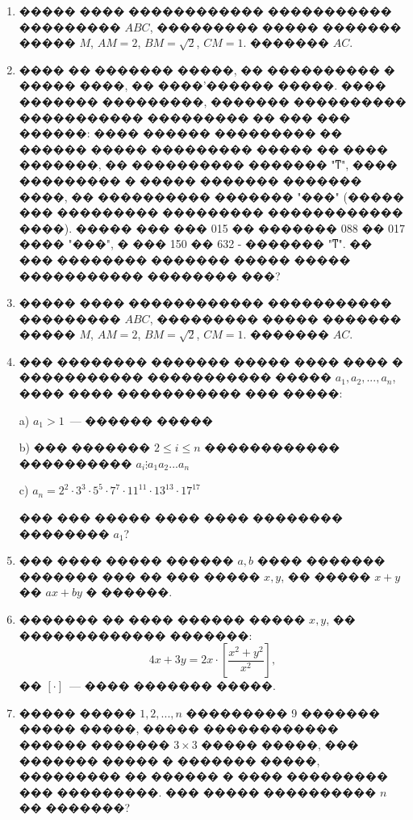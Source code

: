 \documentclass[a4paper,12pt]{article}
\begin{document}
\medskip\medskip\medskip

\begin{enumerate}

\item ����� ���� ������������ ����������� ��������� $ABC$, ��������� ����� ������� ����� $M$, $AM=2$, $BM=\sqrt{2}$, $CM=1$. ������� $AC$.



\item ���� �� ������� �����, �� ���������� � ����� ����, �� ����'������ �����. ���� ������� ���������, ������� ���������� ����������� ��������� �� ��� ��� ������: ���� ������ ��������� �� ������ ����� ��������� ����� �� ���� �������, �� ���������� ������� "ͳ", ���� ��������� � ����� ������� ������� ����, �� ���������� ������� "���" (����� ��� ��������� ��������� ������������ ����). ����� ��� ��� 015 �� ������� 088 �� 017 ���� "���", � ��� 150 �� 632 - ������� "ͳ". �� ��� �������� ������� ����� ����� ����������� �������� ���?



\item ����� ���� ������������ ����������� ��������� $ABC$, ��������� ����� ������� ����� $M$, $AM=2$, $BM=\sqrt{2}$, $CM=1$. ������� $AC$.


\item ��� �������� ������� ����� ���� ���� � ����������� ����������� ����� $a_{1},a_{2},...,a_{n}$, ���� ���� ����������� ��� �����:

a) $a_{1}>1$~--- ������ �����

b) ��� ������� $2\leq i\leq n$ ������������ ���������� $a_{i}\vdots a_{1}a_{2}...a_{n}$

c) $a_{n}=2^{2}\cdot3^{3}\cdot5^{5}\cdot7^{7}\cdot11^{11}\cdot13^{13}\cdot17^{17}$

��� ��� ����� ���� ���� �������� �������� $a_{1}$?

\item ��� ���� ����� ������ $a,b$ ���� ������� ������� ��� �� ��� ����� $x,y$, �� ����� $x+y$ �� $ax+by$ � ������.

\item ������� �� ���� ������ ����� $x,y$, �� ������������� �������: $$4x+3y=2x\cdot [\frac{x^{2}+y^{2}}{x^{2}}],$$ �� $[\cdot]$~--- ���� ������� �����.

\item ����� ����� $1,2,...,n$ ��������� 9 ������� ����� �����, ����� ������������ ������ ������� $3\times 3$ ����� �����, ��� ������� ����� � ������� �����, ��������� �� ������ � ���� ��������� ��� ���������. ��� ����� ���������� $n$ �� �������?




\end{enumerate}
\end{document}
